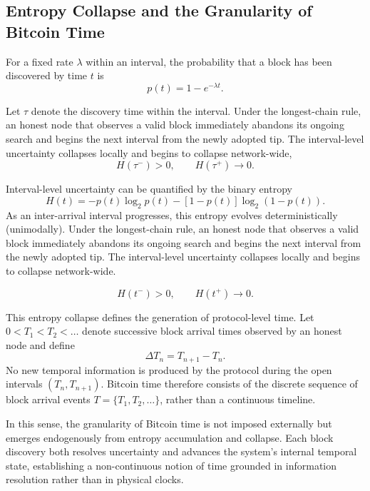 \documentclass[conference]{IEEEtran}
\begin{document}
\subsection{Entropy Collapse and the Granularity of Bitcoin Time}

For a fixed rate $\lambda$ within an interval, the probability that a block has
been discovered by time $t$ is
\begin{equation}
p(t) = 1 - e^{-\lambda t}.
\end{equation}

Let $\tau$ denote the discovery time within the interval. Under the longest-chain
rule, an honest node that observes a valid block immediately abandons its
ongoing search and begins the next interval from the newly adopted tip. The
interval-level uncertainty collapses locally and begins to collapse network-wide,
\begin{equation}
H(\tau^{-}) > 0,
\qquad
H(\tau^{+}) \rightarrow 0.
\end{equation}

Interval-level uncertainty can be quantified by the binary entropy
\begin{equation}
H(t)
= -p(t)\log_2 p(t)
  -[1-p(t)]\log_2(1-p(t)).
\label{eq:entropy}
\end{equation}
As an inter-arrival interval progresses, this entropy evolves deterministically (unimodally).
Under the longest-chain rule, an honest
node that observes a valid block immediately abandons its
ongoing search and begins the next interval from the newly
adopted tip. The interval-level uncertainty collapses locally and begins to collapse network-wide.


\begin{equation}
H(t^{-}) > 0,
\qquad
H(t^{+}) \rightarrow 0.
\end{equation}

This entropy collapse defines the generation of protocol-level time. Let
$0 < T_1 < T_2 < \dots$ denote successive block arrival times observed by an
honest node and define 
\begin{equation}
\Delta T_n = T_{n+1} - T_n.
\end{equation}
No new temporal information is produced by the protocol during the open
intervals $(T_n, T_{n+1})$. Bitcoin time therefore consists of the discrete
sequence of block arrival events $T = \{T_1, T_2, \dots\}$, rather than a
continuous timeline.

In this sense, the granularity of Bitcoin time is not imposed externally but
emerges endogenously from entropy accumulation and collapse. Each block
discovery both resolves uncertainty and advances the system’s internal temporal
state, establishing a non-continuous notion of time grounded in information
resolution rather than in physical clocks.
\end{document}
